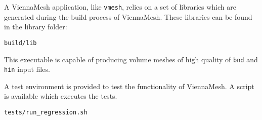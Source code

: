 A ViennaMesh application, like \texttt{vmesh}, relies on a set of libraries 
which are generated during the build process of ViennaMesh. These libraries
can be found in the library folder:
\begin{exaipd}
\begin{Verbatim}
build/lib
\end{Verbatim}
\end{exaipd}

This executable is capable of producing volume meshes of high quality of 
\texttt{bnd} and \texttt{hin} input files. 


A test environment is provided to test the functionality of ViennaMesh. 
A script is available which executes the tests.
\begin{exaipd}
\begin{Verbatim}
tests/run_regression.sh
\end{Verbatim}
\end{exaipd}

